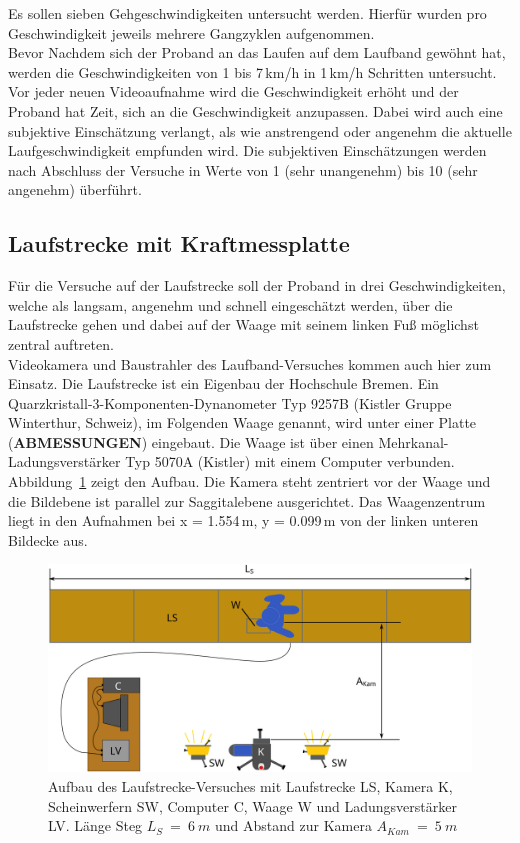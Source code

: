 Es sollen sieben Gehgeschwindigkeiten untersucht werden. Hierfür wurden pro Geschwindigkeit jeweils mehrere Gangzyklen aufgenommen.\\
Bevor 
Nachdem sich der Proband an das Laufen auf dem Laufband gewöhnt hat, werden die Geschwindigkeiten von 1 bis 7\,km/h in 1\,km/h Schritten untersucht. Vor jeder neuen Videoaufnahme wird die Geschwindigkeit erhöht und der Proband hat Zeit, sich an die Geschwindigkeit anzupassen. Dabei wird auch eine subjektive Einschätzung verlangt, als wie anstrengend oder angenehm die aktuelle Laufgeschwindigkeit empfunden wird. Die subjektiven Einschätzungen werden nach Abschluss der Versuche in Werte von 1 (sehr unangenehm) bis 10 (sehr angenehm) überführt.\\

\subsection{Laufstrecke mit Kraftmessplatte}
Für die Versuche auf der Laufstrecke soll der Proband in drei Geschwindigkeiten, welche als {langsam}, angenehm und schnell eingeschätzt werden, über die Laufstrecke gehen und dabei auf der Waage mit seinem linken Fuß möglichst zentral auftreten.\\
Videokamera und Baustrahler des Laufband-Versuches kommen auch hier zum Einsatz. Die Laufstrecke ist ein Eigenbau der Hochschule Bremen. Ein Quarzkristall-3-Komponenten-Dynanometer Typ 9257B (Kistler Gruppe Winterthur, Schweiz), im Folgenden {Waage} genannt, wird unter einer Platte (\textbf{ABMESSUNGEN}) eingebaut. Die Waage ist über einen Mehrkanal-Ladungsverstärker Typ 5070A (Kistler) mit einem Computer verbunden. Abbildung~\ref{fig:laufstg_stp} zeigt den Aufbau. Die Kamera steht zentriert vor der Waage und die Bildebene ist parallel zur Saggitalebene ausgerichtet.
Das Waagenzentrum liegt in den Aufnahmen bei x = 1.554\,m, y = 0.099\,m von der linken unteren Bildecke aus.
\begin{figure}[h!]
	\centering
	\includegraphics[width=0.7\linewidth]{bilder/mat_met/Laufstrecke_setup}
	\caption[Aufbau Laufstrecke Versuch]{Aufbau des Laufstrecke-Versuches mit Laufstrecke LS, Kamera K, Scheinwerfern SW, Computer C, Waage W und Ladungsverstärker LV. Länge Steg $L_S~=~6~m$ und Abstand zur Kamera $A_{Kam}~=~5~m$}
	\label{fig:laufstg_stp}
\end{figure}

